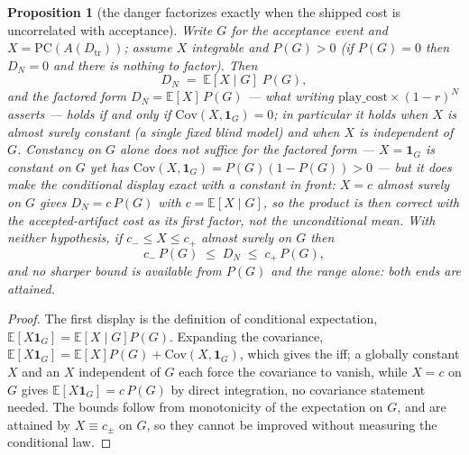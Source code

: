 \documentclass[11pt]{article}
\newtheorem{proposition}{Proposition}
\theoremstyle{definition}
\theoremstyle{remark}
\begin{document}
\begin{proposition}[the danger factorizes exactly when the shipped cost is uncorrelated with acceptance]
\label{prop:risk}
Write $G$ for the acceptance event and $X = \mathrm{PC}(A(D_{\mathrm{tr}}))$; assume $X$ integrable and $P(G) > 0$ (if $P(G) = 0$ then $D_N = 0$ and there is nothing to factor). Then
\[
  D_N \;=\; \mathbb{E}[X \mid G]\;P(G),
\]
and the factored form $D_N = \mathbb{E}[X]\,P(G)$ --- what writing $\mathrm{play\_cost} \times (1-r)^N$ asserts --- holds if and only if $\mathrm{Cov}(X, \mathbf 1_G) = 0$; in particular it holds when $X$ is almost surely constant (a single fixed blind model) and when $X$ is independent of $G$. Constancy on $G$ \emph{alone} does not suffice for the factored form --- $X = \mathbf 1_G$ is constant on $G$ yet has $\mathrm{Cov}(X, \mathbf 1_G) = P(G)(1-P(G)) > 0$ --- but it does make the conditional display exact with a constant in front: $X = c$ almost surely on $G$ gives $D_N = c\,P(G)$ with $c = \mathbb{E}[X \mid G]$, so the product is then correct with the \emph{accepted-artifact} cost as its first factor, not the unconditional mean. With neither hypothesis, if $c_- \leq X \leq c_+$ almost surely on $G$ then
\[
  c_-\,P(G) \;\leq\; D_N \;\leq\; c_+\,P(G),
\]
and no sharper bound is available from $P(G)$ and the range alone: both ends are attained.
\end{proposition}

\begin{proof}
The first display is the definition of conditional expectation, $\mathbb{E}[X\mathbf 1_G] = \mathbb{E}[X\mid G]P(G)$. Expanding the covariance, $\mathbb{E}[X\mathbf 1_G] = \mathbb{E}[X]P(G) + \mathrm{Cov}(X,\mathbf 1_G)$, which gives the iff; a globally constant $X$ and an $X$ independent of $G$ each force the covariance to vanish, while $X = c$ on $G$ gives $\mathbb{E}[X\mathbf 1_G] = c\,P(G)$ by direct integration, no covariance statement needed. The bounds follow from monotonicity of the expectation on $G$, and are attained by $X \equiv c_\pm$ on $G$, so they cannot be improved without measuring the conditional law.
\end{proof}
\end{document}
